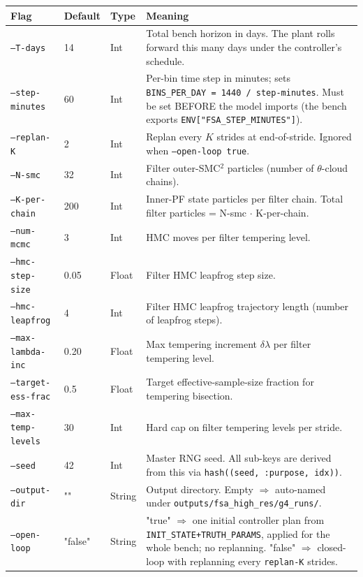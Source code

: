 \documentclass[11pt,a4paper]{article}
\begin{document}
\noindent
\begin{longtable}{@{}lp{}lp{}@{}}
\toprule
Flag & Default & Type & Meaning \\
\midrule
\texttt{--T-days} & 14 & Int &
  Total bench horizon in days. The plant rolls forward this many
  days under the controller's schedule. \\
\texttt{--step-minutes} & 60 & Int &
  Per-bin time step in minutes; sets \texttt{BINS\_PER\_DAY = 1440 /
  step-minutes}. Must be set BEFORE the model imports (the bench
  exports \texttt{ENV["FSA\_STEP\_MINUTES"]}). \\
\texttt{--replan-K} & 2 & Int &
  Replan every $K$ strides at end-of-stride. Ignored when
  \texttt{--open-loop true}. \\
\texttt{--N-smc} & 32 & Int &
  Filter outer-SMC$^2$ particles (number of $\theta$-cloud chains). \\
\texttt{--K-per-chain} & 200 & Int &
  Inner-PF state particles per filter chain. Total filter particles
  = N-smc $\cdot$ K-per-chain. \\
\texttt{--num-mcmc} & 3 & Int &
  HMC moves per filter tempering level. \\
\texttt{--hmc-step-size} & 0.05 & Float &
  Filter HMC leapfrog step size. \\
\texttt{--hmc-leapfrog} & 4 & Int &
  Filter HMC leapfrog trajectory length (number of leapfrog steps). \\
\texttt{--max-lambda-inc} & 0.20 & Float &
  Max tempering increment $\delta\lambda$ per filter tempering level. \\
\texttt{--target-ess-frac} & 0.5 & Float &
  Target effective-sample-size fraction for tempering bisection. \\
\texttt{--max-temp-levels} & 30 & Int &
  Hard cap on filter tempering levels per stride. \\
\texttt{--seed} & 42 & Int &
  Master RNG seed. All sub-keys are derived from this via
  \texttt{hash((seed, :purpose, idx))}. \\
\texttt{--output-dir} & "" & String &
  Output directory. Empty $\Rightarrow$ auto-named under
  \texttt{outputs/fsa\_high\_res/g4\_runs/}. \\
\texttt{--open-loop} & "false" & String &
  "true" $\Rightarrow$ one initial controller plan from
  \texttt{INIT\_STATE+TRUTH\_PARAMS}, applied for the whole bench;
  no replanning. "false" $\Rightarrow$ closed-loop with replanning
  every \texttt{replan-K} strides. \\
\bottomrule
\end{longtable}
\end{document}
